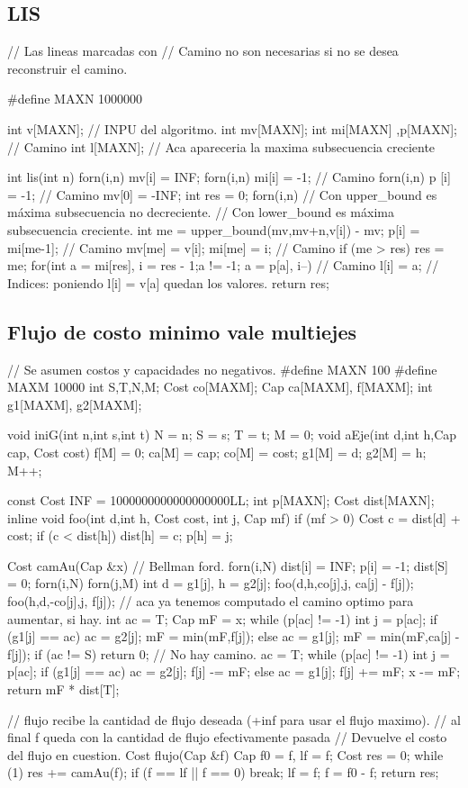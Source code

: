 \documentclass[10pt,landscape,twocolumn,a4paper,notitlepage]{article}
\begin{document}
\subsection{LIS}
\begin{code}
// Las lineas marcadas con // Camino no son necesarias si no se desea reconstruir el camino.

#define MAXN 1000000

int v[MAXN]; // INPU del algoritmo.
int mv[MAXN];
int mi[MAXN] ,p[MAXN]; // Camino
int l[MAXN]; // Aca apareceria la maxima subsecuencia creciente

int lis(int n)
{
	forn(i,n) mv[i] = INF;
	forn(i,n) mi[i] = -1; // Camino
	forn(i,n) p [i] = -1; // Camino
	mv[0] = -INF;
	int res = 0;
	forn(i,n)
	{
		// Con upper_bound es m\'axima subsecuencia no decreciente.
		// Con lower_bound es m\'axima subsecuencia creciente.
		int me = upper_bound(mv,mv+n,v[i]) - mv;
		p[i] = mi[me-1]; // Camino
		mv[me] = v[i];
		mi[me] = i; // Camino
		if (me > res) res = me;
	}
	for(int a = mi[res], i = res - 1;a != -1; a = p[a], i--) // Camino
		l[i] = a; // Indices: poniendo l[i] = v[a] quedan los valores.
	return res;
}
\end{code}
\subsection{Flujo de costo minimo vale multiejes}
\begin{code}
// Se asumen costos y capacidades no negativos.
#define MAXN 100
#define MAXM 10000
int S,T,N,M;
Cost co[MAXM];
Cap ca[MAXM], f[MAXM];
int g1[MAXM], g2[MAXM];

void iniG(int n,int s,int t) { N = n; S = s; T = t; M = 0; }
void aEje(int d,int h,Cap cap, Cost cost) {
	f[M] = 0;
	ca[M] = cap;
	co[M] = cost;
	g1[M] = d;
	g2[M] = h;
	M++;
}

const Cost INF = 1000000000000000000LL;
int p[MAXN];
Cost dist[MAXN];
inline void foo(int d,int h, Cost cost, int j, Cap mf) {
	if (mf > 0)	{
		Cost c = dist[d] + cost;
		if (c < dist[h]) { dist[h] = c; p[h] = j; }
	}
}

Cost camAu(Cap &x) {
	// Bellman ford.
	forn(i,N) {dist[i] =  INF; p[i] = -1;}
	dist[S] = 0;
	forn(i,N) forn(j,M) {
		int d = g1[j], h = g2[j];
		foo(d,h,co[j],j, ca[j] - f[j]);
		foo(h,d,-co[j],j, f[j]);
	} // aca ya tenemos computado el camino optimo para aumentar, si hay.
	int ac = T;
    Cap mF = x;
	while (p[ac] != -1)	{
		int j = p[ac];
		if (g1[j] == ac) { ac = g2[j]; mF = min(mF,f[j]);}
		else             { ac = g1[j]; mF = min(mF,ca[j] - f[j]); }
	}
	if (ac != S) return 0; // No hay camino.
	ac = T;
	while (p[ac] != -1) {
		int j = p[ac];
		if (g1[j] == ac) { ac = g2[j]; f[j] -= mF; }
		else             { ac = g1[j]; f[j] += mF; }
	}
	x -= mF;
	return mF * dist[T];
}

// flujo recibe la cantidad de flujo deseada (+inf para usar el flujo maximo).
// al final f queda con la cantidad de flujo efectivamente pasada
// Devuelve el costo del flujo en cuestion.
Cost flujo(Cap &f) {
	Cap f0 = f, lf = f;
    Cost res = 0;
	while (1) {
		res += camAu(f);
		if (f == lf || f == 0) break;
		lf = f;
	}
	f = f0 - f;
	return res;
}
\end{code}
\end{document}
